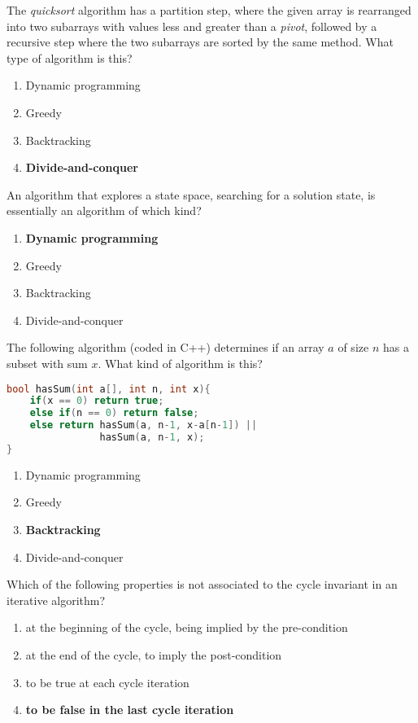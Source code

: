 {
The \emph{quicksort} algorithm has a partition step, where the given array is rearranged into two subarrays with values less and greater than a \emph{pivot}, followed by a recursive step where the two subarrays are sorted by the same method. What type of algorithm is this?
\begin{enumerate}[label=\Alph*)]\itemsep0em
    \item Dynamic programming
    \item Greedy 
    \item Backtracking
    \item \textbf{Divide-and-conquer \greencheckmark}
\end{enumerate}

An algorithm that explores a state space, searching for a solution state, is essentially an algorithm of which kind?
\begin{enumerate}[label=\Alph*)]\itemsep0em
    \item \textbf{Dynamic programming  \greencheckmark}
    \item Greedy 
    \item Backtracking
    \item Divide-and-conquer
\end{enumerate}

The following algorithm (coded in C++) determines if an array $a$ of size $n$ has a subset with sum $x$. What kind of algorithm is this?

\begin{lstlisting}[language=C++]
bool hasSum(int a[], int n, int x){
    if(x == 0) return true;
    else if(n == 0) return false;
    else return hasSum(a, n-1, x-a[n-1]) ||
                hasSum(a, n-1, x);
}
\end{lstlisting}
\begin{enumerate}[label=\Alph*)]\itemsep0em
    \item Dynamic programming
    \item Greedy 
    \item \textbf{Backtracking \greencheckmark}
    \item Divide-and-conquer
\end{enumerate}

Which of the following properties is not associated to the cycle invariant in an iterative algorithm?
\begin{enumerate}[label=\Alph*)]\itemsep0em
    \item at the beginning of the cycle, being implied by the pre-condition
    \item at the end of the cycle, to imply the post-condition
    \item to be true at each cycle iteration
    \item \textbf{to be false in the last cycle iteration \greencheckmark}
\end{enumerate}

}

